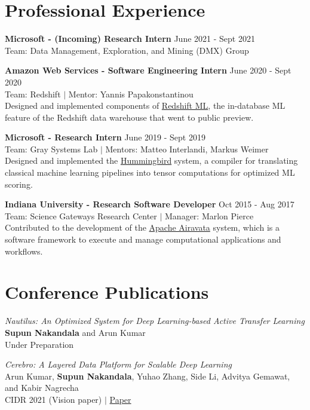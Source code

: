 \documentclass[margin]{res}
\begin{document}
\begin{resume}
\vspace{-4mm}
\section{Professional Experience}

\textbf{Microsoft - (Incoming) Research Intern}
\hfill June 2021 - Sept 2021 \\
Team: Data Management, Exploration, and Mining (DMX) Group

\textbf{Amazon Web Services - Software Engineering Intern}
\hfill June 2020 - Sept 2020 \\
Team: Redshift $|$ Mentor: Yannis Papakonstantinou\\
Designed and implemented components of \href{https://aws.amazon.com/redshift/features/redshift-ml/}{Redshift ML}, the in-database ML feature of the Redshift data warehouse that went to public preview.

\textbf{Microsoft - Research Intern}
\hfill June 2019 - Sept 2019 \\
Team: Gray Systems Lab $|$ Mentors: Matteo Interlandi, Markus Weimer\\
Designed and implemented the \href{https://github.com/microsoft/hummingbird}{Hummingbird} system, a compiler for translating classical machine learning pipelines into tensor computations for optimized ML scoring.

\textbf{Indiana University - Research Software Developer}
\hfill Oct 2015 - Aug 2017 \\
Team: Science Gateways Research Center $|$ Manager: Marlon Pierce\\
Contributed to the development of the \href{https://airavata.apache.org/index.html}{Apache Airavata} system, which is a software framework to execute and manage computational applications and workflows.


\section{Conference Publications}
\par
\textit{Nautilus: An Optimized System for Deep Learning-based Active Transfer Learning} \\
\textbf{Supun Nakandala} and Arun Kumar\\
Under Preparation

\par
\textit{Cerebro: A Layered Data Platform for Scalable Deep Learning} \\
Arun Kumar, \textbf{Supun Nakandala}, Yuhao Zhang,  Side Li, Advitya Gemawat, and Kabir
Nagrecha\\
CIDR 2021 (Vision paper) $|$ \href{https://adalabucsd.github.io/papers/2021_Cerebro_CIDR.pdf}{Paper}


\end{resume}
\end{document}
